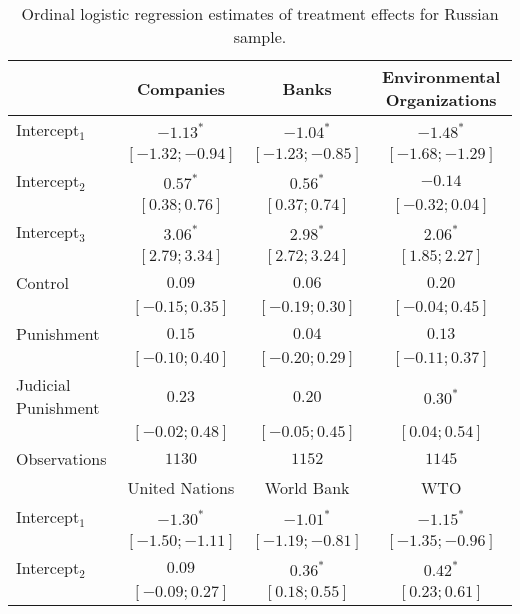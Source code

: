 \begin{table}[h]
\begin{center}
\caption{Ordinal logistic regression estimates of treatment effects for Russian sample.}
\begin{threeparttable}
\begin{tabular}{l c c c}
\hline
 & Companies & Banks & Environmental
Organizations \\
\hline
Intercept$_1$       & $-1.13^{*}$       & $-1.04^{*}$       & $-1.48^{*}$       \\
                    & $ [-1.32; -0.94]$ & $ [-1.23; -0.85]$ & $ [-1.68; -1.29]$ \\
Intercept$_2$       & $0.57^{*}$        & $0.56^{*}$        & $-0.14$           \\
                    & $ [ 0.38;  0.76]$ & $ [ 0.37;  0.74]$ & $ [-0.32;  0.04]$ \\
Intercept$_3$       & $3.06^{*}$        & $2.98^{*}$        & $2.06^{*}$        \\
                    & $ [ 2.79;  3.34]$ & $ [ 2.72;  3.24]$ & $ [ 1.85;  2.27]$ \\
Control             & $0.09$            & $0.06$            & $0.20$            \\
                    & $ [-0.15;  0.35]$ & $ [-0.19;  0.30]$ & $ [-0.04;  0.45]$ \\
Punishment          & $0.15$            & $0.04$            & $0.13$            \\
                    & $ [-0.10;  0.40]$ & $ [-0.20;  0.29]$ & $ [-0.11;  0.37]$ \\
Judicial Punishment & $0.23$            & $0.20$            & $0.30^{*}$        \\
                    & $ [-0.02;  0.48]$ & $ [-0.05;  0.45]$ & $ [ 0.04;  0.54]$ \\
\hline
Observations        & $1130$            & $1152$            & $1145$            \\
\hline
 & United Nations & World Bank & WTO \\
\hline
Intercept$_1$       & $-1.30^{*}$       & $-1.01^{*}$       & $-1.15^{*}$       \\
                    & $ [-1.50; -1.11]$ & $ [-1.19; -0.81]$ & $ [-1.35; -0.96]$ \\
Intercept$_2$       & $0.09$            & $0.36^{*}$        & $0.42^{*}$        \\
                    & $ [-0.09;  0.27]$ & $ [ 0.18;  0.55]$ & $ [ 0.23;  0.61]$ \\

\end{tabular}
\end{threeparttable}
\end{center}
\end{table}
